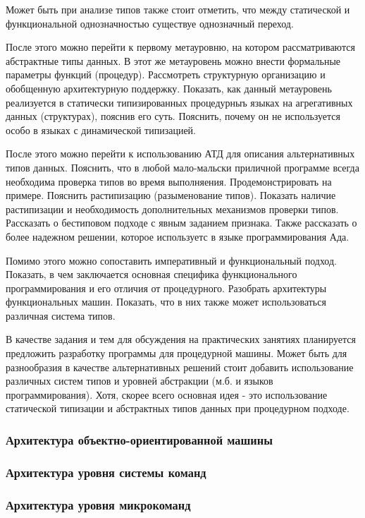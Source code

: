 Может быть при анализе типов также стоит отметить, что между статической и функциональной однозначностью существуе однозначный переход.

После этого можно перейти к первому метауровню, на котором рассматриваются абстрактные типы данных. В этот же метауровень можно внести формальные параметры функций (процедур). Рассмотреть структурную организацию и обобщенную архитектурную поддержку. Показать, как данный метауровень реализуется в статически типизированных процедурныъ языках на агрегативных данных (структурах), пояснив его суть. Пояснить, почему он не используется особо в языках с динамической типизацией.

После этого можно перейти к использованию АТД для описания альтернативных типов данных. Пояснить, что в любой мало-мальски приличной программе всегда необходима проверка типов во время выполняения. Продемонстрировать на примере. Пояснить растипизацию (разыменование типов). Показать наличие растипизации и необходимость дополнительных механизмов проверки типов. Рассказать о бестиповом подходе с явным заданием признака. Также рассказать о более надежном решении, которое используетс в языке программирования Ада.

Помимо этого можно сопоставить императивный и функциональный подход. Показать, в чем заключается основная специфика функционального программирования и его отличия от процедурного. Разобрать архитектуры функциональных машин. Показать, что в них также может использоваться различная система типов.

В качестве задания и тем для обсуждения на практических занятиях планируется предложить разработку программы для процедурной машины. Может быть для разнообразия в качестве альтернативных решений стоит добавить использование различных систем типов и уровней абстракции (м.б. и языков программирования). Хотя, скорее всего основная идея - это использование статической типизации и абстрактных типов данных при процедурном подходе.


\subsubsection*{Архитектура объектно-ориентированной машины}

\subsubsection*{Архитектура уровня системы команд}

\subsubsection*{Архитектура уровня микрокоманд}

